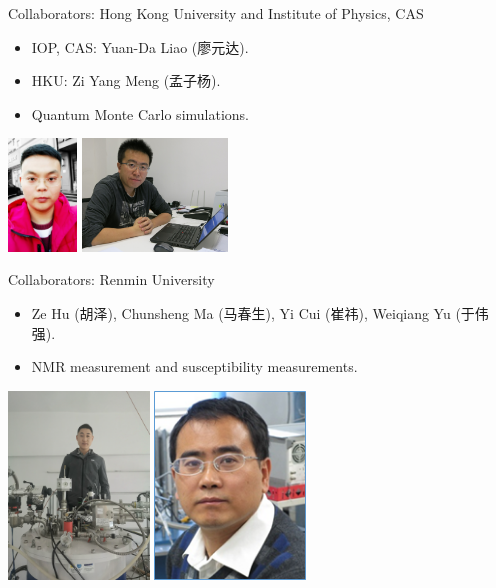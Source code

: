 \documentclass[xcolor=table, aspectratio=1610,ignorenonframetext]{beamer}
\begin{document}
\begin{frame}{Collaborators: Hong Kong University and Institute of Physics, CAS}
\begin{itemize}
	\item IOP, CAS: Yuan-Da Liao (廖元达).
	\item HKU: Zi Yang Meng (孟子杨).
	\item Quantum Monte Carlo simulations.
\end{itemize}
	\begin{center}
		\includegraphics[height=3cm]{../people/yuandaliao}
		\includegraphics[height=3cm]{../people/ziyangmeng}
	\end{center}
\end{frame}

\begin{frame}{Collaborators: Renmin University}
\begin{itemize}
	\item Ze Hu (胡泽), Chunsheng Ma (马春生), Yi Cui (崔祎), Weiqiang Yu (于伟强).
	\item NMR measurement and susceptibility measurements.
\end{itemize}
	\begin{center}
		\includegraphics[height=5cm]{../people/zehu_large}
		\includegraphics[height=5cm]{../people/weiqiangyu}
	\end{center}
\end{frame}
\end{document}

